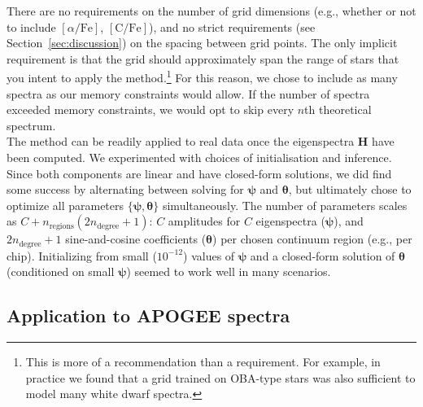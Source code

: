 \documentclass[modern]{aastex631}
\newcommand{\vectheta}{\boldsymbol{\theta}}
\newcommand{\vecpsi}{\boldsymbol{\psi}}
\newcommand{\vecW}{\mathbf{W}}
\newcommand{\vecH}{\mathbf{H}}
\begin{document}
There are no requirements on the number of grid dimensions (e.g., whether or not to include $[\alpha/\mathrm{Fe}]$, $[\mathrm{C/Fe}]$), and no strict requirements (see Section~\ref{sec:discussion}) on the spacing between grid points. The only implicit requirement is that the grid should approximately span the range of stars that you intent to apply the method.\footnote{This is more of a recommendation than a requirement. For example, in practice we found that a grid trained on OBA-type stars was also sufficient to model many white dwarf spectra.} For this reason, we chose to include as many spectra as our memory constraints would allow. If the number of spectra exceeded memory constraints, we would opt to skip every $n$th theoretical spectrum.\\






The method can be readily applied to real data once the eigenspectra $\vecH$ have been computed. We experimented with choices of initialisation and inference. Since both components are linear and have closed-form solutions, we did find some success by alternating between solving for $\vecpsi$ and $\vectheta$, but ultimately chose to optimize all parameters $\{\vecpsi,\vectheta\}$ simultaneously. The number of parameters scales as $C + n_\textrm{regions}(2n_\textrm{degree} + 1)$: $C$ amplitudes for $C$ eigenspectra ($\vecpsi$), and $2n_\textrm{degree} + 1$ sine-and-cosine coefficients ($\vectheta$) per chosen continuum region (e.g., per chip). Initializing from small ($10^{-12}$) values of $\vecpsi$ and a closed-form solution of $\vectheta$ (conditioned on small $\vecpsi$) seemed to work well in many scenarios. \\


\subsection{Application to APOGEE spectra}
\label{sec:apogee}
\end{document}

